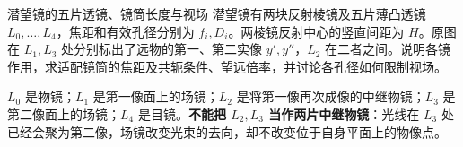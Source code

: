 \begin{advexamplebox}{潜望镜的五片透镜、镜筒长度与视场}\label{advA5:ex:periscope}
潜望镜有两块反射棱镜及五片薄凸透镜 $L_0,\ldots,L_4$，焦距和有效孔径分别为 $f_i,D_i$。两棱镜反射中心的竖直间距为 $H$。原图在 $L_1,L_3$ 处分别标出了远物的第一、第二实像 $y',y''$，$L_2$ 在二者之间。说明各镜作用，求适配镜筒的焦距及共轭条件、望远倍率，并讨论各孔径如何限制视场。

\end{advexamplebox}
\begin{advsolution}
$L_0$ 是物镜；$L_1$ 是第一像面上的场镜；$L_2$ 是将第一像再次成像的中继物镜；$L_3$ 是第二像面上的场镜；$L_4$ 是目镜。\textbf{不能把 $L_2,L_3$ 当作两片中继物镜}：光线在 $L_3$ 处已经会聚为第二像，场镜改变光束的去向，却不改变位于自身平面上的物像点。


\end{advsolution}
